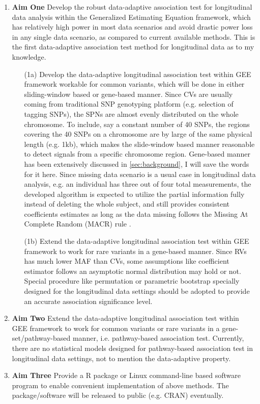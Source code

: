 \documentclass[12pt]{article}
\begin{document}
\begin{enumerate}
\item \textbf{Aim One}
Develop the robust data-adaptive association test for longitudinal data analysis within the Generalized Estimating Equation framework, which has relatively high power in most data scenarios and avoid drastic power loss in any single data scenario, as compared to current available methods. This is the first data-adaptive association test method for longitudinal data as to my knowledge.

\begin{enumerate}
\item[(1a)]
Develop the data-adaptive longitudinal association test within GEE framework workable for common variants, which will be done in either sliding-window based or gene-based manner. Since CVs are usually coming from traditional SNP genotyping platform (e.g. selection of tagging SNPs), the SPNs are almost evenly distributed on the whole chromosome. To include, say a constant number of 40 SNPs, the regions covering the 40 SNPs on a chromosome are by large of the same physical length (e.g. 1kb), which makes the slide-window based manner reasonable to detect signals from a specific chromosome region. Gene-based manner has been extensively discussed in \ref{sec:background}, I will save the words for it here. Since missing data scenario is a usual case in longitudinal data analysis, e.g. an individual has three out of four total measurements, the developed algorithm is expected to utilize the partial information fully instead of deleting the whole subject, and still provides consistent coefficients estimates as long as the data missing follows the Missing At Complete Random (MACR) rule \cite{rubin1976inference,Xu2014}.
\item[(1b)]
Extend the data-adaptive longitudinal association test within GEE framework to work for rare variants in a gene-based manner. Since RVs has much lower MAF than CVs, some assumptions like coefficient estimator follows an asymptotic normal distribution may hold or not. Special procedure like permutation or parametric bootstrap specially designed for the longitudinal data settings should be adopted to provide an accurate association significance level.
\end{enumerate}

\item \textbf{Aim Two}
Extend the data-adaptive longitudinal association test within GEE framework to work for common variants or rare variants in a gene-set/pathway-based manner, i.e. pathway-based association test. Currently, there are no statistical models designed for pathway-based association test in longitudinal data settings, not to mention the data-adaptive property.

\item \textbf{Aim Three}
Provide a R package or Linux command-line based software program to enable convenient implementation of above methods. The package/software will be released to public (e.g. CRAN) eventually.
\end{enumerate}
\end{document}

